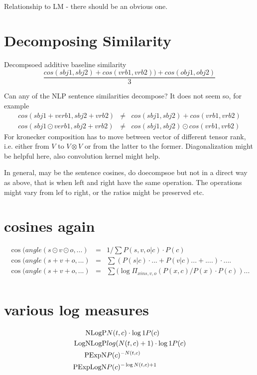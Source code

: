 Relationship to LM - there should be an obvious one.


\section{Decomposing Similarity}
Decompsoed additive baseline similarity
\[
\frac{cos(sbj1,sbj2) + cos(vrb1,vrb2)) + cos(obj1,obj2)}{3}
\]

Can any of the NLP sentence similarities decompose? It does not seem so, for example
\begin{eqnarray*}
cos(sbj1+verb1,sbj2+vrb2) &\neq& cos(sbj1, sbj2) + cos(vrb1,vrb2) \\
cos(sbj1\odot verb1,sbj2+vrb2) &\neq& cos(sbj1, sbj2) \odot cos(vrb1,vrb2)
\end{eqnarray*}
For kronecker composition has to move between vector of different tensor rank, i.e. either from $V$ to $V \otimes V$ or from the latter to the former. Diagonalization might be helpful here, also convolution kernel might help. 

In general, may be the sentence cosines, do doecompsoe but not in a direct way as above, that is when left and right have the same operation. The operations might vary from lef to right, or the ratios might be preserved etc. 



\section{cosines again}

\begin{eqnarray}
\cos(angle(s\odot v\odot o, ...) &=&  1/ \sum P(s,v,o|c) \cdot P(c)\\
\cos(angle(s+v+o, ...) &=& \sum (P(s|c)  \cdot  ... + P(v|c) ... + ....)  \cdot  ....\\
\cos(angle(s+v+o, ...) &=&  \sum (\log{\Pi_{x in s,v,o} (P(x,c)/P(x) \cdot P(c)) ...}\\
\end{eqnarray}

\section{various log measures}

\begin{eqnarray}
\textmd{NLogP}&   N(t,c)  \cdot \log{1}{P(c)}\\
\textmd{LogNLogP}&  log(N(t,c)+1) \cdot \log{1}{P(c)}\\
\textmd{PExpN}&    P(c)^{-N(t,c)}\\
\textmd{PExpLogN}& P(c)^{-\log{N(t,c)+1}}\\
\end{eqnarray}

